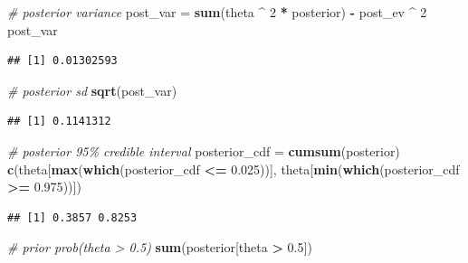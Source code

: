 \documentclass[
]{book}
\newenvironment{Shaded}{\begin{snugshade}}{\end{snugshade}}
\newcommand{\CommentTok}[1]{\textcolor[rgb]{0.56,0.35,0.01}{\textit{#1}}}
\newcommand{\DecValTok}[1]{\textcolor[rgb]{0.00,0.00,0.81}{#1}}
\newcommand{\FloatTok}[1]{\textcolor[rgb]{0.00,0.00,0.81}{#1}}
\newcommand{\KeywordTok}[1]{\textcolor[rgb]{0.13,0.29,0.53}{\textbf{#1}}}
\newcommand{\NormalTok}[1]{#1}
\newcommand{\OperatorTok}[1]{\textcolor[rgb]{0.81,0.36,0.00}{\textbf{#1}}}
\newcommand{\StringTok}[1]{\textcolor[rgb]{0.31,0.60,0.02}{#1}}
\theoremstyle{definition}
\theoremstyle{definition}
\theoremstyle{definition}
\theoremstyle{remark}
\begin{document}
\begin{Shaded}
\begin{Highlighting}[]
\CommentTok{\# posterior variance}
\NormalTok{post\_var =}\StringTok{ }\KeywordTok{sum}\NormalTok{(theta }\OperatorTok{\^{}}\StringTok{ }\DecValTok{2} \OperatorTok{*}\StringTok{ }\NormalTok{posterior) }\OperatorTok{{-}}\StringTok{ }\NormalTok{post\_ev }\OperatorTok{\^{}}\StringTok{ }\DecValTok{2}
\NormalTok{post\_var}
\end{Highlighting}
\end{Shaded}

\begin{verbatim}
## [1] 0.01302593
\end{verbatim}

\begin{Shaded}
\begin{Highlighting}[]
\CommentTok{\# posterior sd}
\KeywordTok{sqrt}\NormalTok{(post\_var)}
\end{Highlighting}
\end{Shaded}

\begin{verbatim}
## [1] 0.1141312
\end{verbatim}

\begin{Shaded}
\begin{Highlighting}[]
\CommentTok{\# posterior 95\% credible interval}
\NormalTok{posterior\_cdf =}\StringTok{ }\KeywordTok{cumsum}\NormalTok{(posterior)}
\KeywordTok{c}\NormalTok{(theta[}\KeywordTok{max}\NormalTok{(}\KeywordTok{which}\NormalTok{(posterior\_cdf }\OperatorTok{\textless{}=}\StringTok{ }\FloatTok{0.025}\NormalTok{))], theta[}\KeywordTok{min}\NormalTok{(}\KeywordTok{which}\NormalTok{(posterior\_cdf }\OperatorTok{\textgreater{}=}\StringTok{ }\FloatTok{0.975}\NormalTok{))])}
\end{Highlighting}
\end{Shaded}

\begin{verbatim}
## [1] 0.3857 0.8253
\end{verbatim}

\begin{Shaded}
\begin{Highlighting}[]
\CommentTok{\# prior prob(theta \textgreater{} 0.5)}
\KeywordTok{sum}\NormalTok{(posterior[theta }\OperatorTok{\textgreater{}}\StringTok{ }\FloatTok{0.5}\NormalTok{])}
\end{Highlighting}
\end{Shaded}
\end{document}
